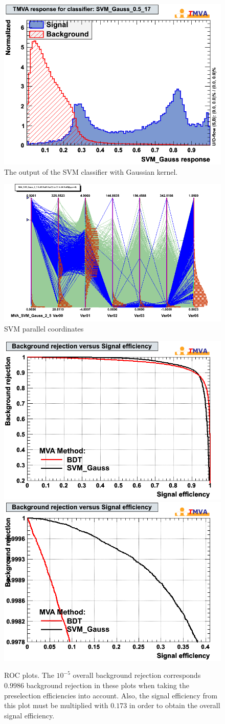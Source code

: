 \begin{figure}[h]
  \begin{center}
    \includegraphics[width=.3\textwidth]{images/mk_svm_gauss2}
  \end{center}
  \caption{The output of the SVM classifier with Gaussian kernel.}
  \label{fig:mkSvmGauss2}
\end{figure}

\begin{figure}[h]
  \begin{center}
    \includegraphics[width=.3\textwidth]{images/svm_parallels}
  \end{center}
  \caption{SVM parallel coordinates}
  \label{fig:mkSvmParallels}
\end{figure}

\begin{figure}[h]
  \begin{center}
    \hfill
    \includegraphics[width=.3\textwidth]{images/mk_roc}
    \hfill
    \includegraphics[width=.3\textwidth]{images/mk_roc_zoomed}
    \hfill
  \end{center}
  \caption{ROC plots. The $10^{-5}$ overall background rejection
    corresponds $0.9986$ background rejection in these plots when
    taking the preselection efficiencies into account. Also, the
    signal efficiency from this plot must be multiplied with $0.173$
    in order to obtain the overall signal efficiency.}
  \label{fig:mkROC}
\end{figure}

\clearpage